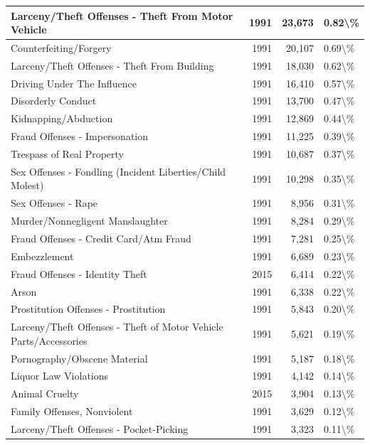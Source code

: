 \documentclass[
]{krantz}
\begin{document}
\begin{longtable}[t]{l|r|r|l}
\hline
Larceny/Theft Offenses - Theft From Motor Vehicle & 1991 & 23,673 & 0.82\textbackslash{}\%\\
\hline
Counterfeiting/Forgery & 1991 & 20,107 & 0.69\textbackslash{}\%\\
\hline
Larceny/Theft Offenses - Theft From Building & 1991 & 18,030 & 0.62\textbackslash{}\%\\
\hline
Driving Under The Influence & 1991 & 16,410 & 0.57\textbackslash{}\%\\
\hline
Disorderly Conduct & 1991 & 13,700 & 0.47\textbackslash{}\%\\
\hline
Kidnapping/Abduction & 1991 & 12,869 & 0.44\textbackslash{}\%\\
\hline
Fraud Offenses - Impersonation & 1991 & 11,225 & 0.39\textbackslash{}\%\\
\hline
Trespass of Real Property & 1991 & 10,687 & 0.37\textbackslash{}\%\\
\hline
Sex Offenses - Fondling (Incident Liberties/Child Molest) & 1991 & 10,298 & 0.35\textbackslash{}\%\\
\hline
Sex Offenses - Rape & 1991 & 8,956 & 0.31\textbackslash{}\%\\
\hline
Murder/Nonnegligent Manslaughter & 1991 & 8,284 & 0.29\textbackslash{}\%\\
\hline
Fraud Offenses - Credit Card/Atm Fraud & 1991 & 7,281 & 0.25\textbackslash{}\%\\
\hline
Embezzlement & 1991 & 6,689 & 0.23\textbackslash{}\%\\
\hline
Fraud Offenses - Identity Theft & 2015 & 6,414 & 0.22\textbackslash{}\%\\
\hline
Arson & 1991 & 6,338 & 0.22\textbackslash{}\%\\
\hline
Prostitution Offenses - Prostitution & 1991 & 5,843 & 0.20\textbackslash{}\%\\
\hline
Larceny/Theft Offenses - Theft of Motor Vehicle Parts/Accessories & 1991 & 5,621 & 0.19\textbackslash{}\%\\
\hline
Pornography/Obscene Material & 1991 & 5,187 & 0.18\textbackslash{}\%\\
\hline
Liquor Law Violations & 1991 & 4,142 & 0.14\textbackslash{}\%\\
\hline
Animal Cruelty & 2015 & 3,904 & 0.13\textbackslash{}\%\\
\hline
Family Offenses, Nonviolent & 1991 & 3,629 & 0.12\textbackslash{}\%\\
\hline
Larceny/Theft Offenses - Pocket-Picking & 1991 & 3,323 & 0.11\textbackslash{}\%\\

\end{longtable}
\end{document}
